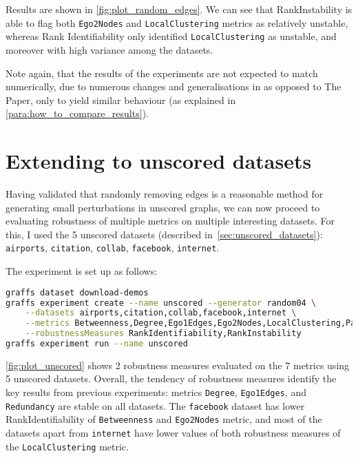 

Results are shown in \autoref{fig:plot_random_edges}.
We can see that RankInstability is able to flag both \texttt{Ego2Nodes} and \texttt{LocalClustering} metrics as relatively unstable, whereas Rank Identifiability only identified \texttt{LocalClustering} as unstable, and moreover with high variance among the datasets.

Note again, that the results of the experiments are not expected to match numerically, due to numerous changes and generalisations in \graffs as opposed to The Paper, only to yield similar behaviour (as explained in \autoref{para:how_to_compare_results}).


\section{Extending to unscored datasets}

Having validated that randomly removing edges is a reasonable method for generating small perturbations in unscored graphs, we can now proceed to evaluating robustness of multiple metrics on multiple interesting datasets.
For this, I used the 5 unscored datasets (described in~\autoref{sec:unscored_datasets}): \texttt{airports}, \texttt{citation}, \texttt{collab}, \texttt{facebook}, \texttt{internet}.

The experiment is set up as follows:
\begin{lstlisting}[language=bash]
graffs dataset download-demos
graffs experiment create --name unscored --generator random04 \
    --datasets airports,citation,collab,facebook,internet \
    --metrics Betweenness,Degree,Ego1Edges,Ego2Nodes,LocalClustering,PageRank,Redundancy \
    --robustnessMeasures RankIdentifiability,RankInstability
graffs experiment run --name unscored
\end{lstlisting}



\autoref{fig:plot_unscored} shows 2 robustness measures evaluated on the 7 metrics using 5 unscored datasets.
Overall, the tendency of robustness measures identify the key results from previous experiments: metrics \texttt{Degree}, \texttt{Ego1Edges}, and \texttt{Redundancy} are stable on all datasets.
The \texttt{facebook} dataset has lower RankIdentifiability of \texttt{Betweenness} and \texttt{Ego2Nodes} metric, and most of the datasets apart from \texttt{internet} have lower values of both robustness measures of the \texttt{LocalClustering} metric.

